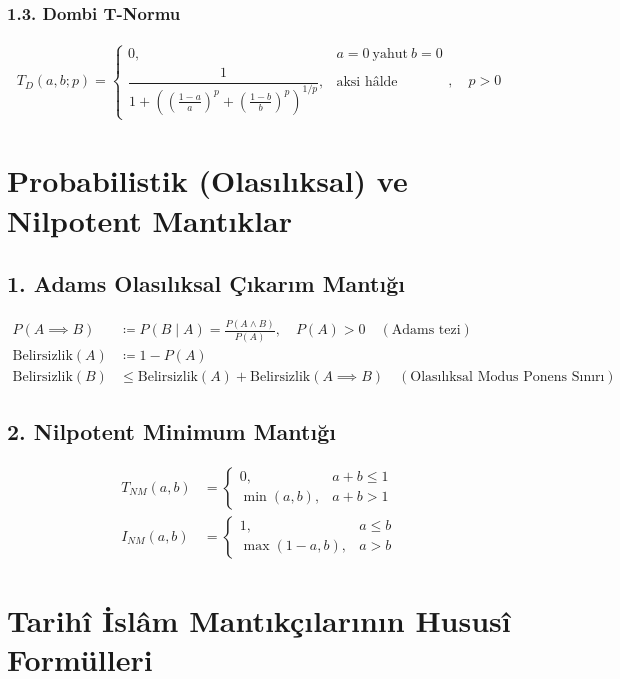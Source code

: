 \documentclass[11pt, a4paper]{article}
\begin{document}
\subsubsection{1.3. Dombi T-Normu}
\begin{align}
T_{D}(a, b; p) = \begin{cases} 0, & a = 0 \ \text{yahut} \ b = 0 \\ \dfrac{1}{1 + \left( \left(\frac{1-a}{a}\right)^p + \left(\frac{1-b}{b}\right)^p \right)^{1/p}}, & \text{aksi hâlde} \end{cases}, \quad p > 0
\end{align}

\section{Probabilistik (Olasılıksal) ve Nilpotent Mantıklar}

\subsection{1. Adams Olasılıksal Çıkarım Mantığı}
\begin{align}
P(A \implies B) &\coloneqq P(B \mid A) = \frac{P(A \land B)}{P(A)}, \quad P(A) > 0 \quad (\text{Adams tezi}) \\
\text{Belirsizlik}(A) &\coloneqq 1 - P(A) \\
\text{Belirsizlik}(B) &\le \text{Belirsizlik}(A) + \text{Belirsizlik}(A \implies B) \quad (\text{Olasılıksal Modus Ponens Sınırı})
\end{align}

\subsection{2. Nilpotent Minimum Mantığı}
\begin{align}
T_{NM}(a, b) &= 
\begin{cases}
0, & a + b \le 1 \\
\min(a, b), & a + b > 1
\end{cases} \\
I_{NM}(a, b) &= 
\begin{cases}
1, & a \le b \\
\max(1-a, b), & a > b
\end{cases}
\end{align}

\section{Tarihî İslâm Mantıkçılarının Hususî Formülleri}
\end{document}
